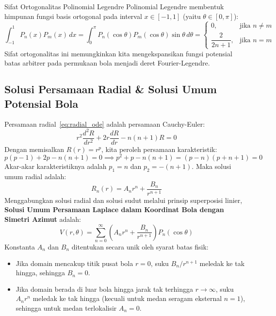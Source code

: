 \documentclass[11pt,a4paper]{article}
\theoremstyle{definition}
\begin{document}
\begin{theorembox}{Sifat Ortogonalitas Polinomial Legendre}
Polinomial Legendre membentuk himpunan fungsi basis ortogonal pada interval $x \in [-1, 1]$ (yaitu $\theta \in [0, \pi]$):
\begin{equation}
    \int_{-1}^{1} P_n(x) P_m(x) \, dx = \int_{0}^{\pi} P_n(\cos\theta) P_m(\cos\theta) \sin\theta \, d\theta = 
    \begin{cases}
        0, & \text{jika } n \neq m \\
        \dfrac{2}{2n + 1}, & \text{jika } n = m
    \end{cases}
    \label{eq:legendre_orthogonality}
\end{equation}
Sifat ortogonalitas ini memungkinkan kita mengekspansikan fungsi potensial batas arbitrer pada permukaan bola menjadi deret Fourier-Legendre.
\end{theorembox}

\subsection{Solusi Persamaan Radial \& Solusi Umum Potensial Bola}
Persamaan radial~\eqref{eq:radial_ode} adalah persamaan Cauchy-Euler:
\begin{equation}
    r^2 \frac{d^2 R}{dr^2} + 2r \frac{dR}{dr} - n(n+1) R = 0
\end{equation}
Dengan memisalkan $R(r) = r^p$, kita peroleh persamaan karakteristik:
\begin{equation}
    p(p-1) + 2p - n(n+1) = 0 \implies p^2 + p - n(n+1) = (p - n)(p + n + 1) = 0
\end{equation}
Akar-akar karakteristiknya adalah $p_1 = n$ dan $p_2 = -(n+1)$. Maka solusi umum radial adalah:
\begin{equation}
    R_n(r) = A_n r^n + \frac{B_n}{r^{n+1}}
\end{equation}
Menggabungkan solusi radial dan solusi sudut melalui prinsip superposisi linier, \textbf{Solusi Umum Persamaan Laplace dalam Koordinat Bola dengan Simetri Azimut} adalah:
\begin{equation}
    V(r, \theta) = \sum_{n=0}^{\infty} \left( A_n r^n + \frac{B_n}{r^{n+1}} \right) P_n(\cos\theta)
    \label{eq:general_solution_spherical}
\end{equation}
Konstanta $A_n$ dan $B_n$ ditentukan secara unik oleh syarat batas fisik:
\begin{itemize}[leftmargin=*]
    \item Jika domain mencakup titik pusat bola $r = 0$, suku $B_n/r^{n+1}$ meledak ke tak hingga, sehingga $B_n = 0$.
    \item Jika domain berada di luar bola hingga jarak tak terhingga $r \to \infty$, suku $A_n r^n$ meledak ke tak hingga (kecuali untuk medan seragam eksternal $n=1$), sehingga untuk medan terlokalisir $A_n = 0$.
\end{itemize}
\end{document}
